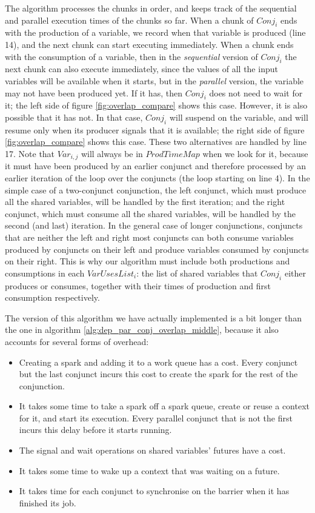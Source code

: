{The algorithm processes the chunks in order, and keeps track
of the sequential and parallel execution times of the chunks so far.
When a chunk of $Conj_i$ ends with the production of a variable,
we record when that variable is produced (line 14),
and the next chunk can start executing immediately.
When a chunk ends with the consumption of a variable,
then in the \emph{sequential} version of $Conj_i$
the next chunk can also execute immediately,
since the values of all the input variables will be available when it starts,
but in the \emph{parallel} version,
the variable may not have been produced yet.
If it has, then $Conj_i$ does not need to wait for it;
the left side of figure \ref{fig:overlap_compare} shows this case.
However, it is also possible that it has not.
In that case, $Conj_i$ will suspend on the variable,
and will resume only when its producer signals that it is available;
the right side of figure \ref{fig:overlap_compare} shows this case.
These two alternatives are handled by line 17.
Note that $Var_{i, j}$
will always be in $ProdTimeMap$ when we look for it,
because it must have been produced by an earlier conjunct
and therefore processed by an earlier iteration of the loop over the
conjuncts (the loop starting on line 4).
In the simple case of a two-conjunct conjunction,
the left conjunct,
which must produce all the shared variables,
will be handled by the first iteration;
and the right conjunct,
which must consume all the shared variables,
will be handled by the second (and last) iteration.
In the general case of longer conjunctions,
conjuncts that are neither the left and right most conjuncts
can both consume variables produced by conjuncts on their left
and produce variables consumed by conjuncts on their right.
This is why our algorithm must include both productions and consumptions
in each $VarUsesList_i$:
the list of shared variables that $Conj_i$ either produces or consumes,
together with their times of production and first consumption respectively.

The version of this algorithm we have actually implemented is
a bit longer than the one in algorithm \ref{alg:dep_par_conj_overlap_middle},
because it also accounts for several forms of overhead:

\begin{itemize}
\item
Creating a spark and adding it to a work queue has a cost.
Every conjunct but the last conjunct incurs this cost
to create the spark for the rest of the conjunction.
\item
It takes some time to take a spark off a spark queue,
create or reuse a context for it, and start its execution.
Every parallel conjunct that is not the first incurs this delay
before it starts running.
\item
The signal and wait operations on shared variables' futures have a cost.
\item
It takes some time to wake up a context that was waiting on a future.
\item
It takes time for each conjunct to synchronise on the barrier
when it has finished its job.
\end{itemize}

}
